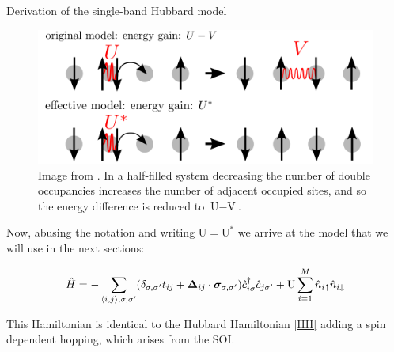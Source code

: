 \begin{section}{Derivation of the single-band Hubbard model}
\begin{figure}
\centering
  \includegraphics[width=0.5\linewidth]{../Figures/non_local_coulomb.png}
  \caption{Image from \cite{Schuler2013}. In a half-filled system decreasing the number of double occupancies increases the number of adjacent occupied sites, and so the energy difference is reduced to $\text{U}-\text{V}$.} 
\label{Fig2.1}
\end{figure}

Now, abusing the notation and writing $\text{U} = \text{U}^*$ we arrive at the model that we will use in the next sections:

\begin{equation}
\label{Hubbard}
\hat{H} = -\sum_{\langle i,j \rangle, \sigma, \sigma'}(\delta_{\sigma, \sigma'} t_{ij} + \boldsymbol{\Delta}_{ij} \cdot \boldsymbol{\sigma}_{\sigma, \sigma'})\hat{c}_{i \sigma}^\dagger \hat{c}_{j \sigma'} + \text{U} \sum_{i=1}^M \hat{n}_{i\uparrow}\hat{n}_{i\downarrow}
\end{equation}

This Hamiltonian is identical to the Hubbard Hamiltonian \ref{HH} adding a spin dependent hopping, which arises from the SOI.

\end{section}


